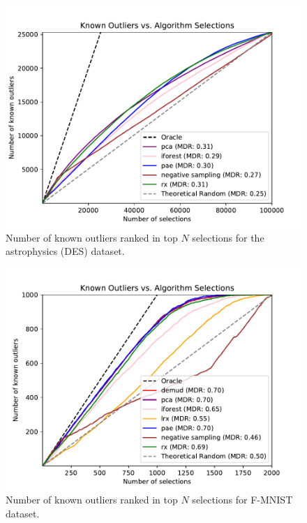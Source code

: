 \documentclass[utf8]{frontiersFPHY} %
\begin{document}
\begin{figure}
\centering
\includegraphics[width=0.6\linewidth]{figures/des_combined_plot.pdf}
\caption{Number of known outliers ranked in top $N$ selections for 
the astrophysics (DES) dataset.}
\label{fig:des_results}
\end{figure}

\begin{figure}
    \centering
    \includegraphics[width=0.6\linewidth]{figures/fmnist_combined_plot.pdf}
    \caption{Number of known outliers ranked in top $N$ selections for 
    F-MNIST dataset.}
    \label{fig:fmnist_results}
\end{figure}
\end{document}
